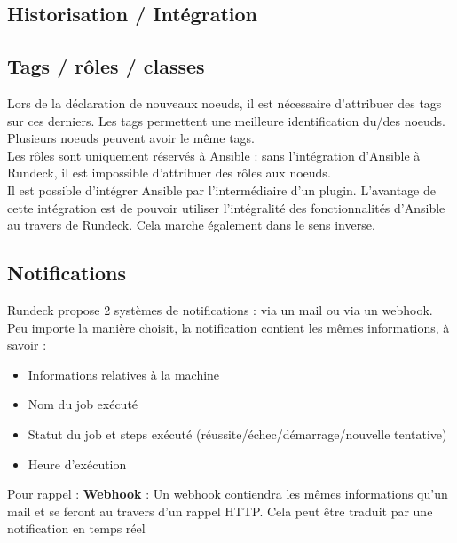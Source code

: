 \documentclass[12pt]{article}
\begin{document}
\subsection{Historisation / Intégration}


\subsection{Tags / rôles / classes}
Lors de la déclaration de nouveaux noeuds, il est nécessaire d'attribuer des tags sur ces derniers. Les tags permettent une meilleure identification du/des noeuds. Plusieurs noeuds peuvent avoir le même tags.
\\
Les rôles sont uniquement réservés à Ansible : sans l'intégration d'Ansible à Rundeck, il est impossible d'attribuer des rôles aux noeuds.
\\
Il est possible d'intégrer Ansible par l'intermédiaire d'un plugin. L'avantage de cette intégration est de pouvoir utiliser l'intégralité des fonctionnalités d'Ansible au travers de Rundeck. Cela marche également dans le sens inverse.

\subsection{Notifications}
Rundeck propose 2 systèmes de notifications : via un mail ou via un webhook.
\\
Peu importe la manière choisit, la notification contient les mêmes informations, à savoir :
\begin{itemize}
    \item Informations relatives à la machine
    \item Nom du job exécuté
    \item Statut du job et steps exécuté (réussite/échec/démarrage/nouvelle tentative)
    \item Heure d'exécution
\end{itemize}

Pour rappel :
\textbf{Webhook} : Un webhook contiendra les mêmes informations qu'un mail et se feront au travers d'un rappel HTTP. Cela peut être traduit par une notification en temps réel 
\end{document}
